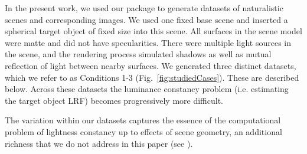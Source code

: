 \documentclass{jov}
\begin{document}
In the present work, we used our package to generate datasets of naturalistic scenes and corresponding images.
We used one fixed base scene and inserted a spherical target object of fixed size into this scene.
All surfaces in the scene model were matte and did not have specularities.
There were multiple light sources in the scene, and the rendering process simulated shadows as well as mutual reflection of light between nearby surfaces.
We generated three distinct datasets, which we refer to as Conditions 1-3 (Fig.~\ref{fig:studiedCases}). These are described below.
Across these datasets the luminance constancy problem (i.e. estimating the target object LRF)
becomes progressively more difficult.

The variation within our datasets captures the essence of the computational problem of lightness constancy
up to effects of scene geometry, an additional richness that we do not address in this paper (see ).
\end{document}
